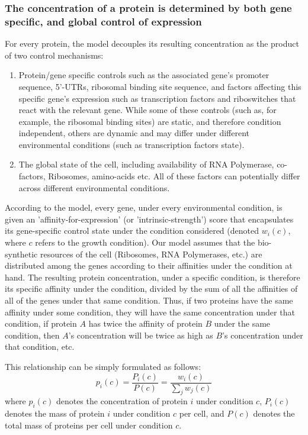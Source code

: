 \documentclass[notitlepage]{article}
\begin{document}
\subsubsection{The concentration of a protein is determined by both gene specific, and global control of expression}
For every protein, the model decouples its resulting concentration as the product of two control mechanisms:
\begin{enumerate}
\item Protein/gene specific controls such as the associated gene's promoter sequence, 5'-UTRs, ribosomal binding site sequence, and factors affecting this specific gene's expression such as transcription factors and riboswitches that react with the relevant gene.
  While some of these controls (such as, for example, the ribosomal binding sites) are static, and therefore condition independent, others are dynamic and may differ under different environmental conditions (such as transcription factors state).
\item The global state of the cell, including availability of RNA Polymerase, co-factors, Ribosomes, amino-acids etc.
  All of these factors can potentially differ across different environmental conditions.
\end{enumerate}
According to the model, every gene, under every environmental condition, is given an 'affinity-for-expression' (or 'intrinsic-strength') score that encapsulates its gene-specific control state under the condition considered (denoted $w_i(c)$, where $c$ refers to the growth condition).
Our model assumes that the bio-synthetic resources of the cell (Ribosomes, RNA Polymerases, etc.) are distributed among the genes according to their affinities under the condition at hand.
The resulting protein concentration, under a specific condition, is therefore its specific affinity under the condition, divided by the sum of all the affinities of all of the genes under that same condition.
Thus, if two proteins have the same affinity under some condition, they will have the same concentration under that condition, if protein $A$ has twice the affinity of protein $B$ under the same condition, then $A$'s concentration will be twice as high as $B$'s concentration under that condition, etc.

This relationship can be simply formulated as follows:
\begin{equation}
  \label{eq:concentration-ratio}
  p_i(c)=\frac{P_i(c)}{P(c)}=\frac{w_i(c)}{\sum_jw_j(c)}
\end{equation}
where $p_i(c)$ denotes the concentration of protein $i$ under condition $c$, $P_i(c)$ denotes the mass of protein $i$ under condition $c$ per cell, and $P(c)$ denotes the total mass of proteins per cell under condition $c$.
\end{document}
